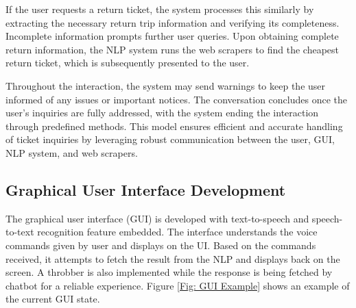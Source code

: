 \noindent
If the user requests a return ticket, the system processes this similarly by extracting the necessary return trip information and verifying its completeness. Incomplete information prompts further user queries. Upon obtaining complete return information, the NLP system runs the web scrapers to find the cheapest return ticket, which is subsequently presented to the user.\vspace{0.5cm}

\noindent
Throughout the interaction, the system may send warnings to keep the user informed of any issues or important notices. The conversation concludes once the user's inquiries are fully addressed, with the system ending the interaction through predefined methods. This model ensures efficient and accurate handling of ticket inquiries by leveraging robust communication between the user, GUI, NLP system, and web scrapers.

\subsection{Graphical User Interface Development}
The graphical user interface (GUI) is developed with text-to-speech and speech-to-text recognition feature embedded. The interface understands the voice commands given by user and displays on the UI. Based on the commands received, it attempts to fetch the result from the NLP and displays back on the screen. A throbber is also implemented while the response is being fetched by chatbot for a reliable experience. Figure \ref{Fig: GUI Example} shows an example of the current GUI state.

